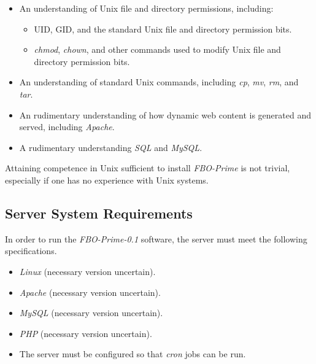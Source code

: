 \documentclass[letterpaper,10pt,titlepage]{article}
\newcommand{\productbasename}{FBO-Prime}
\newcommand{\productversion}{0.1}
\newcommand{\productname}{\productbasename{}-\productversion}
\begin{document}
\begin{itemize}
\item An understanding of Unix file and directory permissions, including:
      \begin{itemize}
      \item {}UID, 
            GID, and the standard Unix file and directory permission bits.
      \item {}\emph{chmod}, 
            \emph{chown}, and other commands used to modify
            Unix file and directory permission bits. 
      \end{itemize}
\item An understanding of standard Unix commands, including
      \emph{cp},
      \emph{mv},
      \emph{rm}, and
      \emph{tar}.
\item An rudimentary understanding of how dynamic web content is generated and served,
      including \emph{Apache}.
\item A rudimentary understanding \emph{SQL} and \emph{MySQL}.
\end{itemize}

Attaining competence in Unix sufficient to install
\emph{\productbasename{}} is not trivial, especially if one has no experience
with Unix systems.


\subsection{Server System Requirements}
\label{sins0:ssyr0}

In order to run the \emph{\productname{}} software, the 
server must meet the
following specifications.

\begin{itemize}
\item \emph{Linux}  (necessary version uncertain).
\item \emph{Apache} (necessary version uncertain).
\item \emph{MySQL}  (necessary version uncertain).
\item \emph{PHP}    (necessary version uncertain).
\item The server must be configured so that \emph{cron} jobs can
      be run.
\end{itemize}
\end{document}

